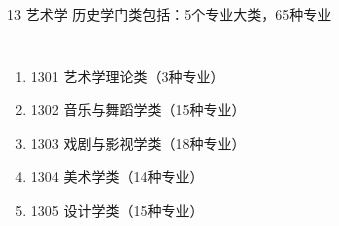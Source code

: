 \documentclass[aspectratio=169]{ctexbeamer} %
\begin{document}
\begin{frame}[t]{13 艺术学}
历史学门类包括：5个专业大类，65种专业
\begin{spacing}{1.0} %
\begin{columns}
{\large
\begin{enumerate}[label={\arabic*.}]
\item 1301 艺术学理论类（3种专业）
\item 1302 音乐与舞蹈学类（15种专业）
\item 1303 戏剧与影视学类（18种专业）
\item 1304 美术学类（14种专业）
\item 1305 设计学类（15种专业）
\end{enumerate} 
}
\end{columns}
\end{spacing}
\end{frame}
\end{document}

